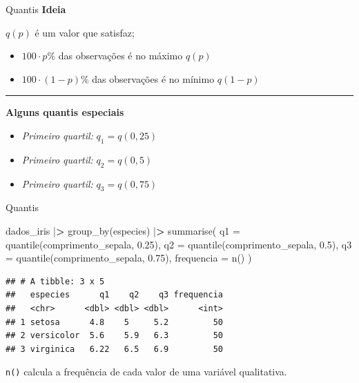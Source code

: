 \documentclass[
  10pt,
  ignorenonframetext,
]{beamer}
\newenvironment{Shaded}{}{}
\newcommand{\DataTypeTok}[1]{#1}
\newcommand{\ErrorTok}[1]{\textcolor[rgb]{1.00,0.00,0.00}{\textbf{#1}}}
\newcommand{\FloatTok}[1]{#1}
\newcommand{\KeywordTok}[1]{\textcolor[rgb]{0.00,0.00,1.00}{#1}}
\newcommand{\NormalTok}[1]{#1}
\newcommand{\OperatorTok}[1]{#1}
\newcommand{\StringTok}[1]{\textcolor[rgb]{0.00,0.50,0.50}{#1}}
\providecommand{\tightlist}{%
  \setlength{\itemsep}{0pt}\setlength{\parskip}{0pt}}
\begin{document}
\begin{frame}{Quantis}
\protect\hypertarget{quantis}{}
\textbf{Ideia}

\(q(p)\) é um valor que satisfaz;

\begin{itemize}
\tightlist
\item
  \(100 \cdot p\%\) das observações é no máximo \(q(p)\)
\item
  \(100 \cdot (1-p)\%\) das observações é no mínimo \(q(1-p)\)
\end{itemize}

\rule{\textwidth}{0.5pt}

\textbf{Alguns quantis especiais}

\begin{itemize}
\tightlist
\item
  \emph{Primeiro quartil:} \(q_1 = q(0,25)\)
\item
  \emph{Primeiro quartil:} \(q_2 = q(0,5)\)
\item
  \emph{Primeiro quartil:} \(q_3 = q(0,75)\)
\end{itemize}
\end{frame}

\begin{frame}[fragile]{Quantis}
\protect\hypertarget{quantis-1}{}
\begin{Shaded}
\begin{Highlighting}[]
\NormalTok{dados\_iris }\OperatorTok{|}\ErrorTok{\textgreater{}}
\StringTok{  }\KeywordTok{group\_by}\NormalTok{(especies) }\OperatorTok{|}\ErrorTok{\textgreater{}}
\StringTok{  }\KeywordTok{summarise}\NormalTok{(}
    \DataTypeTok{q1 =} \KeywordTok{quantile}\NormalTok{(comprimento\_sepala, }\FloatTok{0.25}\NormalTok{),}
    \DataTypeTok{q2 =} \KeywordTok{quantile}\NormalTok{(comprimento\_sepala, }\FloatTok{0.5}\NormalTok{),}
    \DataTypeTok{q3 =} \KeywordTok{quantile}\NormalTok{(comprimento\_sepala, }\FloatTok{0.75}\NormalTok{),}
    \DataTypeTok{frequencia =} \KeywordTok{n}\NormalTok{()}
\NormalTok{  )}
\end{Highlighting}
\end{Shaded}

\begin{verbatim}
## # A tibble: 3 x 5
##   especies      q1    q2    q3 frequencia
##   <chr>      <dbl> <dbl> <dbl>      <int>
## 1 setosa      4.8    5     5.2         50
## 2 versicolor  5.6    5.9   6.3         50
## 3 virginica   6.22   6.5   6.9         50
\end{verbatim}

\texttt{n()} calcula a frequência de cada valor de uma variável
qualitativa.
\end{frame}
\end{document}
